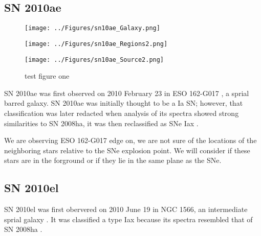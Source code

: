 \documentclass[preprint]{aastex}
\begin{document}
\begin{centering}
\subsection{SN 2010ae}
\begin{figure}
\begin{minipage}[c][5cm][t]{.6\textwidth}
  \vspace*{\fill}
  \centering
  \texttt{[image: ../Figures/sn10ae\_Galaxy.png]}
  \caption{test figure one}
  \label{fig:10aegal}
\end{minipage}%
\begin{minipage}[c][5cm][t]{.5\textwidth}
  \vspace*{\fill}
  \centering
  \texttt{[image: ../Figures/sn10ae\_Regions2.png]}
  \label{fig:r10ae}\par%
  \texttt{[image: ../Figures/sn10ae\_Source2.png]}
  \label{fig:s10ae}
\end{minipage}
\end{figure}
\end{centering}
SN 2010ae was first observed on 2010 February 23 in ESO 162-G017 \citep{pig10}, a sprial barred galaxy.
SN 2010ae was initially thought to be a Ia SN; however, that classification
was later redacted when analysis of its spectra showed strong similarities to
SN 2008ha, it was then reclassified as SNe Iax \citep{str1003}.

We are observing ESO 162-G017 edge on, we are not sure of the locations of the neighboring stars
relative to the SNe explosion point. 
We will consider if these stars are in the forground or if they lie in the same plane as the SNe.


\subsection{SN 2010el}

SN 2010el was first obervered on 2010 June 19 in NGC 1566, 
an intermediate sprial galaxy \citep{mon10}. 
It was classified a type Iax because its
spectra resembled that of SN 2008ha \citep{bes10}.
\end{document}
